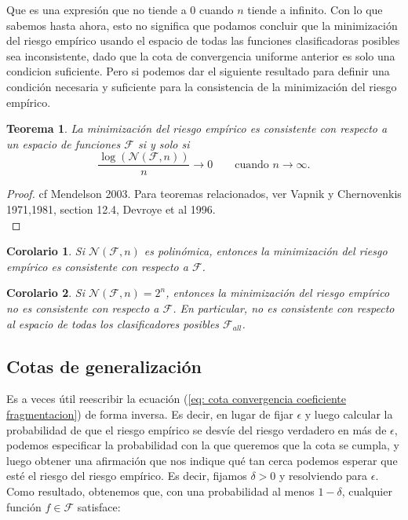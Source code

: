 \documentclass{report}
\newtheorem{thm}{Teorema}[subsection]
\newtheorem{cor}{Corolario}[thm]
\begin{document}
Que es una expresión que no tiende a $0$ cuando $n$ tiende a infinito. Con lo que sabemos hasta ahora, esto no significa que podamos 
concluir que la minimización del riesgo empírico
usando el espacio de todas las funciones clasificadoras posibles sea inconsistente, dado que la cota de convergencia uniforme anterior
es solo una condicion suficiente. Pero si podemos dar el siguiente resultado para definir una condición necesaria y suficiente para
la consistencia de la minimización del riesgo empírico.
\begin{thm}
    La minimización del riesgo empírico es consistente con respecto a un espacio de funciones $\mathcal{F}$ si y solo si
    \[
    \frac{\log\left(\mathcal{N}(\mathcal{F}, n)\right)}{n} \rightarrow 0 \qquad \text{cuando } n \to \infty.
    \]
    
\end{thm}
\begin{proof}
    cf Mendelson 2003. Para teoremas relacionados, ver Vapnik y Chernovenkis 1971,1981, section 12.4, Devroye et al 1996.\\
\end{proof}

\begin{cor}
    Si $\mathcal{N}(\mathcal{F}, n)$ es polinómica, entonces la minimización del riesgo empírico es consistente con respecto a $\mathcal{F}$.\\
\end{cor}
\begin{cor}
    Si $\mathcal{N}(\mathcal{F}, n)=2^n$, entonces la minimización del riesgo empírico no es consistente con respecto a $\mathcal{F}$. En 
    particular, no es consistente con respecto al espacio de todas los clasificadores posibles $\mathcal{F}_{all}$.
\end{cor}

\subsection{Cotas de generalización}

Es a veces útil reescribir la ecuación (\ref{eq: cota convergencia coeficiente fragmentacion}) de forma inversa. Es decir, en lugar de 
fijar \(\epsilon\) y 
luego calcular la probabilidad de que el riesgo empírico se desvíe del riesgo verdadero en más de \(\epsilon\), 
podemos especificar la probabilidad con la que queremos que la cota se cumpla, y luego obtener una afirmación 
que nos indique qué tan cerca podemos esperar que esté el riesgo del riesgo empírico. Es decir, fijamos \(\delta > 0\) 
y resolviendo para \(\epsilon\). Como resultado, obtenemos que, con una probabilidad al menos \(1 - \delta\), cualquier 
función \(f \in \mathcal{F}\) satisface:
\end{document}
